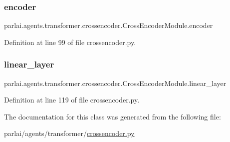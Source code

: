 \subsubsection{\texorpdfstring{encoder}{encoder}}
{\footnotesize\ttfamily parlai.\+agents.\+transformer.\+crossencoder.\+Cross\+Encoder\+Module.\+encoder}



Definition at line 99 of file crossencoder.\+py.

\mbox{\label{classparlai_1_1agents_1_1transformer_1_1crossencoder_1_1CrossEncoderModule_a50568203fcea07cca868109b95dc8dfc}} 
\subsubsection{\texorpdfstring{linear\+\_\+layer}{linear\_layer}}
{\footnotesize\ttfamily parlai.\+agents.\+transformer.\+crossencoder.\+Cross\+Encoder\+Module.\+linear\+\_\+layer}



Definition at line 119 of file crossencoder.\+py.



The documentation for this class was generated from the following file\+:\begin{DoxyCompactItemize}
\item 
parlai/agents/transformer/\hyperlink{crossencoder_8py}{crossencoder.\+py}\end{DoxyCompactItemize}
